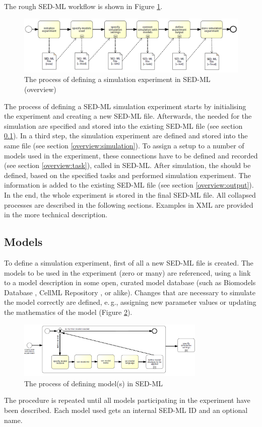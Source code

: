 %
The rough SED-ML workflow is shown in Figure \ref{fig:sedmlWorkflow}.
%
\begin{figure}[h]
\centering
\includegraphics[width=\textwidth]{images/bpmn/sedMainOryx.png}
\caption{The process of defining a simulation experiment in SED-ML (overview)}
\label{fig:sedmlWorkflow}
\end{figure}
%
The process of defining a SED-ML simulation experiment starts by initialising the experiment and creating a new SED-ML file. Afterwards, the  needed for the simulation are specified and stored into the existing SED-ML file (see section \ref{overview:models}). In a third step, the simulation experiment  are defined and stored into the same file (see section \ref{overview:simulation}). To assign a setup to a number of models used in the experiment, these connections have to be defined and recorded (see section \ref{overview:task}), called  in SED-ML. After simulation, the  should be defined, based on the specified tasks and performed simulation experiment. The information is added to the existing SED-ML file (see section \ref{overview:output}). In the end, the whole experiment is stored in the final SED-ML file.
%
All collapsed processes are described in the following sections. Examples in XML are provided in the more technical description.

\subsection{Models}
\label{overview:models}
To define a simulation experiment, first of all a new SED-ML file is created. The models to be used in the experiment (zero or many) are referenced, using a link to a model description in some open, curated model database (such as Biomodels Database \cite{LDR+10}, CellML Repository \cite{BBC+09}, or alike). Changes that are necessary to simulate the model correctly are defined, e.\,g., assigning new parameter values or updating the mathematics of the model (Figure \ref{fig:workflowModel}).
%
\begin{figure}[h]
\centering
\includegraphics[width=0.8\textwidth]{images/bpmn/sedModelOryx.png}
\caption{The process of defining model(s) in SED-ML}
\label{fig:workflowModel}
\end{figure}
%
The procedure is repeated until all models participating in the experiment have been described. Each model used gets an internal SED-ML ID and an optional name.

